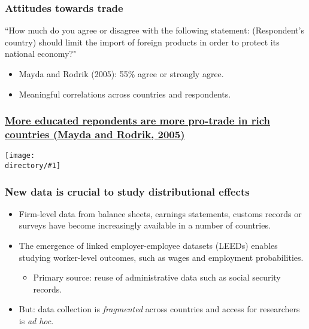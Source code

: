 \documentclass[aspectratio=169,compress,mathserif]{beamer}
\newcommand{\directory}{./exhibits}
\newcommand{\longfigure}[2]{\begin{frame}\frametitle{\hyperlink{#1back}{#2}}\hypertarget{#1}{{\begin{center}\texttt{[image: \\directory/\#1]}\end{center}}}\end{frame}}
\begin{document}
\begin{frame}\frametitle{Attitudes towards trade}\hypertarget{Attitudes towards trade}{}
``How much do you agree or disagree with the following statement: (Respondent’s country) should limit the import of foreign products in order to protect its national economy?"


\begin{itemize}
\item Mayda and Rodrik (2005): 55\% agree or strongly agree.

\item Meaningful correlations across countries and respondents.


\end{itemize}
\end{frame}




\longfigure{attitude-education}{More educated repondents are more pro-trade in rich countries (Mayda and Rodrik, 2005)}


\begin{frame}\frametitle{New data is crucial to study distributional effects}\hypertarget{New data is crucial to study distributional effects}{}
\begin{itemize}
\item Firm-level data from balance sheets, earnings statements, customs records or
surveys have become increasingly available in a number of countries.

\item The emergence of linked employer-employee datasets (LEEDs) enables studying worker-level outcomes, such as wages
and employment probabilities.
\begin{itemize}
\item Primary source: reuse of administrative data such as social security records. 
\pause


\end{itemize}

\item But: data collection is \emph{fragmented} across countries and access for researchers is \emph{ad hoc}.




\end{itemize}
\end{frame}
\end{document}
